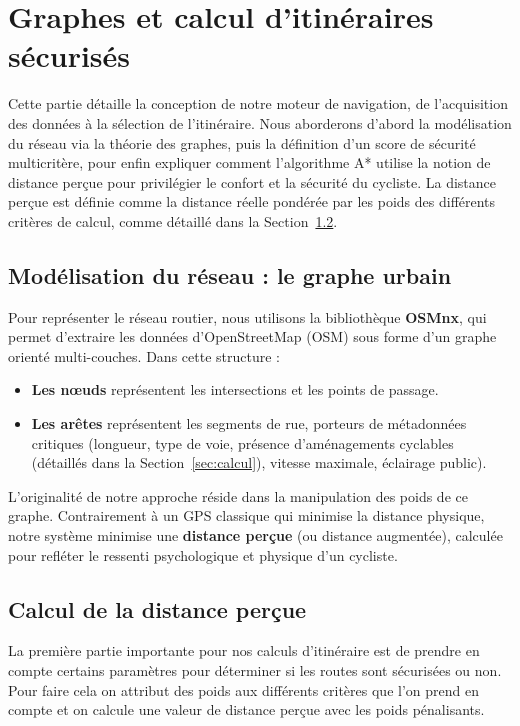 \section{Graphes et calcul d'itinéraires sécurisés}
\label{sec:graphes}

Cette partie détaille la conception de notre moteur de navigation, de l'acquisition des données à la sélection de l'itinéraire. Nous aborderons d'abord la modélisation du réseau via la théorie des graphes, puis la définition d'un score de sécurité multicritère, pour enfin expliquer comment l'algorithme A* utilise la notion de distance perçue pour privilégier le confort et la sécurité du cycliste. La distance perçue est définie comme la distance réelle pondérée par les poids des différents critères de calcul, comme détaillé dans la Section~\ref{sec:distancePercue}.

\subsection{Modélisation du réseau : le graphe urbain}

Pour représenter le réseau routier, nous utilisons la bibliothèque \textbf{OSMnx}, qui permet d'extraire les données d'OpenStreetMap (OSM) sous forme d'un graphe orienté multi-couches. Dans cette structure :
\begin{itemize}
\item \textbf{Les nœuds} représentent les intersections et les points de passage.
\item \textbf{Les arêtes} représentent les segments de rue, porteurs de métadonnées critiques (longueur, type de voie, présence d'aménagements cyclables (détaillés dans la Section~\ref{sec:calcul}), vitesse maximale, éclairage public).
\end{itemize}

L'originalité de notre approche réside dans la manipulation des poids de ce graphe. Contrairement à un GPS classique qui minimise la distance physique, notre système minimise une \textbf{distance perçue} (ou distance augmentée), calculée pour refléter le ressenti psychologique et physique d'un cycliste.

\subsection{Calcul de la distance perçue}
\label{sec:distancePercue}
La première partie importante pour nos calculs d'itinéraire est de prendre en compte certains paramètres pour déterminer si les routes sont sécurisées ou non. Pour faire cela on attribut des poids aux différents critères
que l'on prend en compte et on calcule une valeur de distance perçue avec les poids pénalisants.

